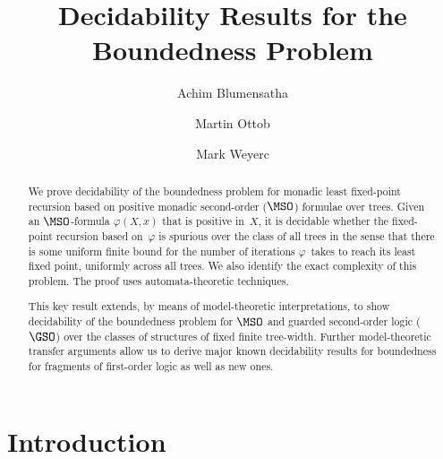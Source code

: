 \documentclass{LMCS}
\begin{document}
\title[Decidability Results for the Boundedness Problem]{Decidability Results for the Boundedness Problem}

\author[A.~Blumensath]{Achim Blumensath\rsuper a}
\address{{}Fachbereich Mathematik, Technische Universit\"at Darmstadt}

\author[M.~Otto]{Martin Otto\rsuper b}
\address{\vspace{-18 pt}}


\author[M.Weier]{Mark Weyer\rsuper c}
\address{{\lsuper c}\vspace{-12 pt}}

\begin{abstract}
We prove decidability of the boundedness problem for
monadic least fixed-point recursion based on
positive monadic second-order ($\MSO$) formulae over trees.
Given an $\MSO$-formula $\varphi(X,x)$ that is positive in~$X$, it is decidable
whether the fixed-point recursion based on~$\varphi$ is spurious
over the class of all trees in the sense that there is some uniform
finite bound for the number of iterations $\varphi$~takes
to reach its least fixed point, uniformly across all trees.
We also identify the exact complexity of this problem.
The proof uses automata-theoretic techniques.

This key result extends, by means of model-theoretic interpretations,
to show decidability of the boundedness problem for $\MSO$
and guarded second-order logic ($\GSO$) over the classes of structures
of fixed finite tree-width. Further model-theoretic transfer arguments
allow us to derive major known decidability results for boundedness
for fragments of first-order logic as well as new ones.
\end{abstract}

\maketitle

\section{Introduction}
\label{sect:intro}
\end{document}
